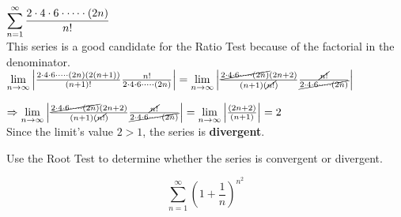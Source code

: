 \documentclass[12pt]{article}
\newcommand{\smallinftylim}[1]{\lim\limits_{n \to \infty} #1}
\begin{document}
\begin{solution}
$\mathlarger{\sum^{\infty}_{n=1} \frac{2 \cdot 4 \cdot 6 \cdot \dots \cdot (2n)}{n!}}$ ~\\

This series is a good candidate for the Ratio Test because of the factorial in the denominator.~\\


$\smallinftylim{ \left|  \frac{2 \cdot 4 \cdot 6 \cdot \dots \cdot (2n)(2(n + 1))}{(n + 1)!} \frac{n!}{2 \cdot 4 \cdot 6 \cdot \dots \cdot (2n)} \right|   } = \smallinftylim{ \left|  \frac{\cancel{2 \cdot 4 \cdot 6 \cdot \dots \cdot (2n)}(2n + 2)}{(n + 1)(\cancel{n!})} \frac{\cancel{n!}}{\cancel{2 \cdot 4 \cdot 6 \cdot \dots \cdot (2n)}} \right|}$ 

$ \Rightarrow \smallinftylim{ \left|  \frac{\cancel{2 \cdot 4 \cdot 6 \cdot \dots \cdot (2n)}(2n + 2)}{(n + 1)(\cancel{n!})} \frac{\cancel{n!}}{\cancel{2 \cdot 4 \cdot 6 \cdot \dots \cdot (2n)}} \right|} = \smallinftylim{ \left| \frac{(2n + 2)}{(n + 1)} \right|} = 2$ ~\\

Since the limit's value $2 > 1$, the series is \textbf{divergent}.
\end{solution}
\pagebreak 
Use the Root Test to determine whether the series is convergent or divergent.

$$\sum^{\infty}_{n=1} \left(1 + \frac{1}{n}\right)^{n^2}$$
\end{document}
